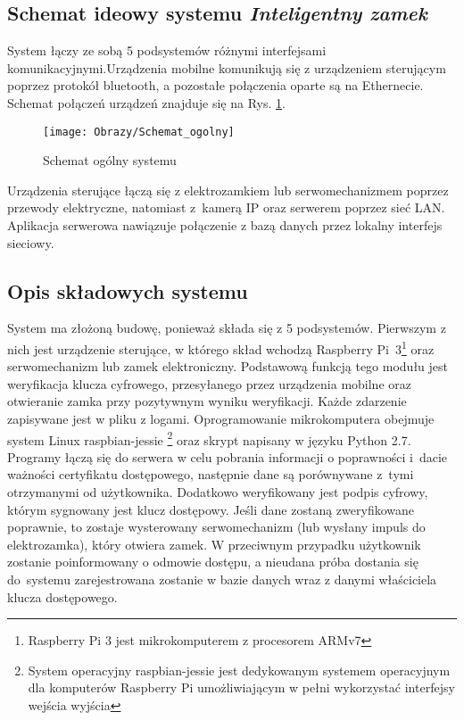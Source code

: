 \documentclass[twoside,10pt]{article}
\def\NazwaSys {\textit{Inteligentny zamek}}
\begin{document}
\subsection{Schemat ideowy systemu \textsl{\NazwaSys}}
System łączy ze sobą 5 podsystemów różnymi interfejsami komunikacyjnymi.Urządzenia mobilne komunikują się z urządzeniem sterującym poprzez protokół bluetooth, a pozostałe połączenia oparte są na Ethernecie. Schemat połączeń urządzeń znajduje się na Rys. \ref{Schemat ogólny systemu}.

\begin{figure}[!h]
\centering
\texttt{[image: Obrazy/Schemat\_ogolny]}
\caption{Schemat ogólny systemu}
\label{Schemat ogólny systemu}
\end{figure}

Urządzenia sterujące łączą się z elektrozamkiem lub serwomechanizmem poprzez przewody elektryczne, natomiast z~kamerą IP oraz serwerem poprzez sieć LAN. Aplikacja serwerowa nawiązuje połączenie z bazą danych przez lokalny interfejs sieciowy.

\subsection{Opis składowych systemu}
System ma złożoną budowę, ponieważ składa się z 5 podsystemów. Pierwszym z nich jest urządzenie sterujące, w którego skład wchodzą Raspberry Pi~3\footnote{ Raspberry Pi 3 jest mikrokomputerem z procesorem ARMv7} oraz serwomechanizm lub zamek elektroniczny. Podstawową funkcją tego modułu jest weryfikacja klucza cyfrowego, przesyłanego przez urządzenia mobilne oraz otwieranie zamka przy pozytywnym wyniku weryfikacji. Każde zdarzenie zapisywane jest w pliku z logami. Oprogramowanie mikrokomputera obejmuje system Linux raspbian-jessie \footnote{ System operacyjny raspbian-jessie jest dedykowanym systemem operacyjnym dla komputerów Raspberry Pi umożliwiającym w pełni wykorzystać interfejsy wejścia wyjścia} oraz skrypt napisany w języku Python 2.7. Programy łączą się do serwera w celu pobrania informacji o poprawności i~dacie ważności certyfikatu dostępowego, następnie dane są porównywane z~tymi otrzymanymi od użytkownika. Dodatkowo weryfikowany jest podpis cyfrowy, którym sygnowany jest klucz dostępowy. Jeśli dane zostaną zweryfikowane poprawnie, to zostaje wysterowany serwomechanizm (lub wysłany impuls do elektrozamka), który otwiera zamek. W przeciwnym przypadku użytkownik zostanie poinformowany o odmowie dostępu, a nieudana próba dostania się do~systemu zarejestrowana zostanie w bazie danych wraz z danymi właściciela klucza dostępowego.
\end{document}
